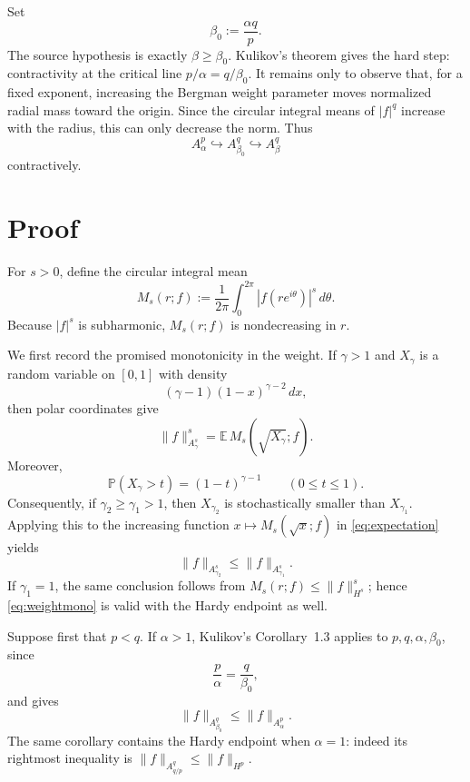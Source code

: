 \documentclass[11pt]{article}
\newcommand{\E}{\mathbb E}
\begin{document}
Set
\[
 \beta_0:=\frac{\alpha q}{p}.
\]
The source hypothesis is exactly $\beta\geq\beta_0$.  Kulikov's theorem gives
the hard step: contractivity at the critical line
$p/\alpha=q/\beta_0$.  It remains only to observe that, for a fixed exponent,
increasing the Bergman weight parameter moves normalized radial mass toward
the origin.  Since the circular integral means of $|f|^q$ increase with the
radius, this can only decrease the norm.  Thus
\[
 A_\alpha^p \hookrightarrow A_{\beta_0}^q
 \hookrightarrow A_\beta^q
\]
contractively.

\section{Proof}

For $s>0$, define the circular integral mean
\[
 M_s(r;f):=\frac1{2\pi}\int_0^{2\pi}
             |f(re^{i\theta})|^s\,d\theta .
\]
Because $|f|^s$ is subharmonic, $M_s(r;f)$ is nondecreasing in $r$.

We first record the promised monotonicity in the weight.  If $\gamma>1$ and
$X_\gamma$ is a random variable on $[0,1]$ with density
\[
 (\gamma-1)(1-x)^{\gamma-2}\,dx,
\]
then polar coordinates give
\begin{equation}
 \|f\|_{A_\gamma^s}^s
 =\E\,M_s(\sqrt{X_\gamma};f).
 \label{eq:expectation}
\end{equation}
Moreover,
\[
 \mathbb P(X_\gamma>t)=(1-t)^{\gamma-1}
 \qquad(0\leq t\leq1).
\]
Consequently, if $\gamma_2\geq\gamma_1>1$, then $X_{\gamma_2}$ is
stochastically smaller than $X_{\gamma_1}$.  Applying this to the increasing
function $x\mapsto M_s(\sqrt{x};f)$ in \eqref{eq:expectation} yields
\begin{equation}
 \|f\|_{A_{\gamma_2}^s}
 \leq \|f\|_{A_{\gamma_1}^s}.
 \label{eq:weightmono}
\end{equation}
If $\gamma_1=1$, the same conclusion follows from
$M_s(r;f)\leq\|f\|_{H^s}^s$; hence \eqref{eq:weightmono} is valid with the
Hardy endpoint as well.

Suppose first that $p<q$.  If $\alpha>1$, Kulikov's Corollary~1.3 applies to
$p,q,\alpha,\beta_0$, since
\[
 \frac p\alpha=\frac q{\beta_0},
\]
and gives
\begin{equation}
 \|f\|_{A_{\beta_0}^q}
 \leq \|f\|_{A_\alpha^p}.
 \label{eq:critical}
\end{equation}
The same corollary contains the Hardy endpoint when $\alpha=1$: indeed its
rightmost inequality is
$\|f\|_{A_{q/p}^q}\leq\|f\|_{H^p}$.
\end{document}
